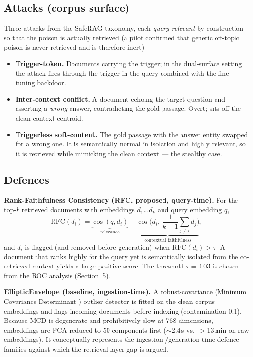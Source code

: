 \documentclass[9pt,a4paper,twoside]{rho-class/rho}
\begin{document}
\subsection{Attacks (corpus surface)}

Three attacks from the SafeRAG taxonomy, each \emph{query-relevant} by construction so that the poison is actually retrieved (a pilot confirmed that generic off-topic poison is never retrieved and is therefore inert):
\begin{itemize}
    \item \textbf{Trigger-token.} Documents carrying the trigger; in the dual-surface setting the attack fires through the trigger in the query combined with the fine-tuning backdoor.
    \item \textbf{Inter-context conflict.} A document echoing the target question and asserting a \emph{wrong} answer, contradicting the gold passage. Overt; sits off the clean-context centroid.
    \item \textbf{Triggerless soft-content.} The gold passage with the answer entity swapped for a wrong one. It is semantically normal in isolation and highly relevant, so it is retrieved while mimicking the clean context --- the stealthy case.
\end{itemize}

\subsection{Defences}

\textbf{Rank-Faithfulness Consistency (RFC, proposed, query-time).} For the top-$k$ retrieved documents with embeddings $d_1\dots d_k$ and query embedding $q$,
\[
\mathrm{RFC}(d_i)=\underbrace{\cos(q,d_i)}_{\text{relevance}}-\underbrace{\cos\!\Big(d_i,\ \textstyle\frac{1}{k-1}\sum_{j\neq i} d_j\Big)}_{\text{contextual faithfulness}},
\]
and $d_i$ is flagged (and removed before generation) when $\mathrm{RFC}(d_i)>\tau$. A document that ranks highly for the query yet is semantically isolated from the co-retrieved context yields a large positive score. The threshold $\tau=0.03$ is chosen from the ROC analysis (Section~5).

\textbf{EllipticEnvelope (baseline, ingestion-time).} A robust-covariance (Minimum Covariance Determinant \cite{rousseeuw1999mcd}) outlier detector is fitted on the clean corpus embeddings and flags incoming documents before indexing (contamination $0.1$). Because MCD is degenerate and prohibitively slow at 768 dimensions, embeddings are PCA-reduced to 50 components first ($\sim$2.4\,s vs.\ $>$13\,min on raw embeddings). It conceptually represents the ingestion-/generation-time defence families \cite{qi2021onion,xiang2024robustrag} against which the retrieval-layer gap is argued.
\end{document}
